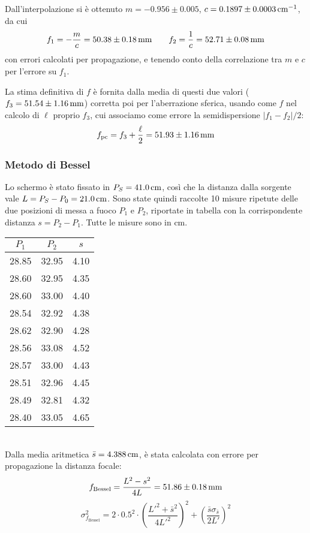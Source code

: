 \documentclass[italian,a4paper]{article}
\begin{document}
Dall'interpolazione si è ottenuto $m=-0.956\pm0.005$, $c=\unit[0.1897\pm0.0003]{cm^{-1}}$, da cui
$$f_1=-\dfrac{m}{c}=\unit[50.38\pm0.18]{mm}\qquad f_2=\dfrac{1}{c}=\unit[52.71\pm0.08]{mm}$$
con errori calcolati per propagazione, e tenendo conto della correlazione tra $m$ e $c$ per l'errore su $f_1$.

La stima definitiva di $f$ è fornita dalla media di questi due valori ($f_3=\unit[51.54\pm1.16]{mm}$) corretta poi per l'aberrazione sferica, usando come $f$ nel calcolo di $\ell$  proprio $f_3$, cui associamo come errore la semidispersione $|f_1-f_2|/2$:
$$f_{\text{pc}}=f_3 + \dfrac{\ell}{2}=\unit[51.93 \pm 1.16]{mm}$$
\subsubsection*{Metodo di Bessel}
Lo schermo è stato fissato in $P_S=\unit[41.0]{cm}$, così che la distanza dalla sorgente vale $L=P_S-P_0=\unit[21.0]{cm}$.
Sono state quindi raccolte 10 misure ripetute delle due posizioni di messa a fuoco $P_1$ e $P_2$, riportate in tabella con la corrispondente distanza $s=P_2-P_1$. Tutte le misure sono in cm.
\begin{table}[h!]
\centering
\begin{tabular}{*3c}
$P_1$& $P_2$& $s$\\\hline
28.85 &32.95 &4.10\\
28.60 &32.95 &4.35\\
28.60 &33.00 &4.40\\
28.54 &32.92 &4.38\\
28.62 &32.90 &4.28\\
28.56 &33.08 &4.52\\
28.57 &33.00 &4.43\\
28.51 &32.96 &4.45\\
28.49 &32.81 &4.32\\
28.40 &33.05 &4.65\\
\end{tabular}
\end{table}\\
Dalla media aritmetica $\bar{s}=\unit[4.388]{cm}$, è stata calcolata con errore per propagazione la distanza focale:
$$f_{\text{Bessel}}=\dfrac{L^2-s^2}{4L}=\unit[51.86 \pm 0.18]{mm}$$
\begin{equation*}
 \sigma_{f_\text{Bessel}}^2 = 2\cdot 0.5^2\cdot\left(\dfrac{L'^2 + \bar{s}^2}{4 L'^2}\right)^2+\left(\dfrac{\bar s \sigma_{\bar s}}{2L'}\right)^2
\end{equation*}
\end{document}
